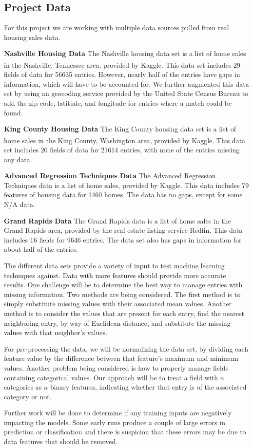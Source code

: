 \documentclass[letter,10pt]{article}
\begin{document}
\begin{multicols}{2}
		\section{Project Data}
		For this project we are working with multiple data sources pulled from real housing sales data.
		\par
		\textbf{Nashville Housing Data} The Nashville housing data set is a list of home sales in the Nashville, Tennessee area, provided by Kaggle\textsuperscript{\cite{nashville_data}}. This data set includes 29 fields of data for 56635 entries. However, nearly half of the entries have gaps in information, which will have to be accounted for. We further augmented this data set by using an geocoding service provided by the United State Census Bureau to add the zip code, latitude, and longitude for entries where a match could be found.
		\par
		\textbf{King County Housing Data} The King County housing data set is a list of home sales in the King County, Washington area, provided by Kaggle\textsuperscript{\cite{kc_data}}. This data set includes 20 fields of data for 21614 entries, with none of the entries missing any data.
		\par
		\textbf{Advanced Regression Techniques Data} The Advanced Regression Techniques data is a list of home sales, provided by Kaggle. This data includes 79 features of housing data for 1460 homes. The data has no gaps, except for some N/A data.
		\par
		\textbf{Grand Rapids Data} The Grand Rapids data is a list of home sales in the Grand Rapids area, provided by the real estate listing service Redfin. This data includes 16 fields for 9646 entries. The data set also has gaps in information for about half of the entries.
		\par
		The different data sets provide a variety of input to test machine learning techniques against. Data with more features should provide more accurate results. One challenge will be to determine the best way to manage entries with missing information. Two methods are being considered. The first method is to simply substitute missing values with their associated mean values. Another method is to consider the values that are present for each entry, find the nearest neighboring entry, by way of Euclidean distance, and substitute the missing values with that neighbor's values.
		\par
		For pre-processing the data, we will be normalizing the data set, by dividing each feature value by the difference between that feature's maximum and minimum values. Another problem being considered is how to properly manage fields containing categorical values. Our approach will be to treat a field with \(n\) categories as \(n\) binary features, indicating whether that entry is of the associated category or not.
		\par
                Further work will be done to determine if any training inputs are negatively impacting the models. Some early runs produce a couple of large errors in prediction or classification and there is suspicion that these errors may be due to data features that should be removed.

\end{multicols}
\end{document}
